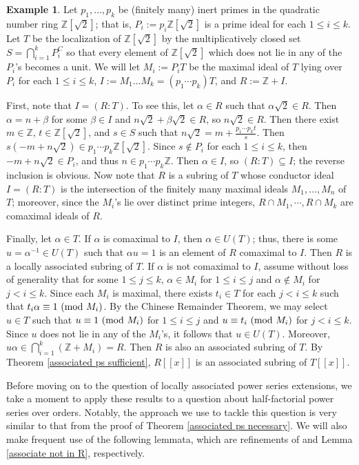 \documentclass[12pt]{amsart}
\theoremstyle{definition}
\newtheorem{example}[theorem]{Example}
\newcommand{\bZ}{\mathbb Z}
\newcommand{\modulo}[1]{\textup{ (mod }#1)}
\begin{document}
\begin{example}
    \label{ps associated}
    Let $p_1,\dots,p_k$ be (finitely many) inert primes in the quadratic number ring $\bZ[\sqrt{2}]$; that is, $P_i:=p_i\bZ[\sqrt{2}]$ is a prime ideal for each $1\leq i\leq k$. Let $T$ be the localization of $\bZ[\sqrt{2}]$ by the multiplicatively closed set $S=\bigcap_{i=1}^kP_i^C$ so that every element of $\bZ[\sqrt{2}]$ which does not lie in any of the $P_i$'s becomes a unit. We will let $M_i:=P_iT$ be the maximal ideal of $T$ lying over $P_i$ for each $1\leq i\leq k$, $I:=M_1\dots M_k=(p_1\cdots p_k)T$, and $R:=\bZ+I$. 
    
    First, note that $I=(R:T)$. To see this, let $\alpha\in R$ such that $\alpha\sqrt{2}\in R$. Then $\alpha=n+\beta$ for some $\beta\in I$ and $n\sqrt{2}+\beta\sqrt{2}\in R$, so $n\sqrt{2}\in R$. Then there exist $m\in \bZ$, $t\in \bZ[\sqrt{2}]$, and $s\in S$ such that $n\sqrt{2}=m+\frac{p_1\cdots p_kt}{s}$. Then $s(-m+n\sqrt{2})\in p_1\cdots p_k\bZ[\sqrt{2}]$. Since $s\notin P_i$ for each $1\leq i\leq k$, then $-m+n\sqrt{2}\in P_i$, and thus $n\in p_1\cdots p_k\bZ$. Then $\alpha\in I$, so $(R:T)\subseteq I$; the reverse inclusion is obvious. Now note that $R$ is a subring of $T$ whose conductor ideal $I=(R:T)$ is the intersection of the finitely many maximal ideals $M_1,\dots,M_n$ of $T$; moreover, since the $M_i$'s lie over distinct prime integers, $R\cap M_1,\cdots,R\cap M_k$ are comaximal ideals of $R$.

    Finally, let $\alpha\in T$. If $\alpha$ is comaximal to $I$, then $\alpha\in U(T)$; thus, there is some $u=\alpha^{-1}\in U(T)$ such that $\alpha u=1$ is an element of $R$ comaximal to $I$. Then $R$ is a locally associated subring of $T$. If $\alpha$ is not comaximal to $I$, assume without loss of generality that for some $1\leq j\leq k$, $\alpha\in M_i$ for $1\leq i\leq j$ and $\alpha\notin M_i$ for $j<i\leq k$. Since each $M_i$ is maximal, there exists $t_i\in T$ for each $j<i\leq k$ such that $t_i\alpha\equiv 1\modulo{M_i}$. By the Chinese Remainder Theorem, we may select $u\in T$ such that $u\equiv 1\modulo{M_i}$ for $1\leq i\leq j$ and $u\equiv t_i\modulo{M_i}$ for $j<i\leq k$. Since $u$ does not lie in any of the $M_i$'s, it follows that $u\in U(T)$. Moreover, $u\alpha\in \bigcap_{i=1}^k(\bZ+M_i)=R$. Then $R$ is also an associated subring of $T$. By Theorem \ref{associated ps sufficient}, $R[[x]]$ is an associated subring of $T[[x]]$.
\end{example}

Before moving on to the question of locally associated power series extensions, we take a moment to apply these results to a question about half-factorial power series over orders. Notably, the approach we use to tackle this question is very similar to that from the proof of Theorem \ref{associated ps necessary}. We will also make frequent use of the following lemmata, which are refinements of \cite[Lemma 6.5]{radicalconductor} and Lemma \ref{associate not in R}, respectively.
\end{document}
